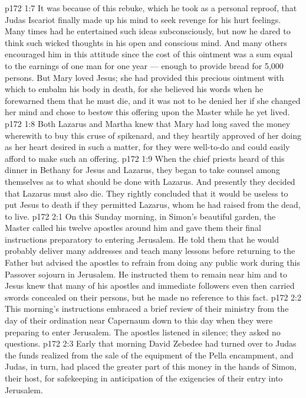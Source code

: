 \vs p172 1:7 It was because of this rebuke, which he took as a personal reproof, that Judas Iscariot finally made up his mind to seek revenge for his hurt feelings. Many times had he entertained such ideas subconsciously, but now he dared to think such wicked thoughts in his open and conscious mind. And many others encouraged him in this attitude since the cost of this ointment was a sum equal to the earnings of one man for one year --- enough to provide bread for 5,000 persons. But Mary loved Jesus; she had provided this precious ointment with which to embalm his body in death, for she believed his words when he forewarned them that he must die, and it was not to be denied her if she changed her mind and chose to bestow this offering upon the Master while he yet lived.
\vs p172 1:8 Both Lazarus and Martha knew that Mary had long saved the money wherewith to buy this cruse of spikenard, and they heartily approved of her doing as her heart desired in such a matter, for they were well\hyp{}to\hyp{}do and could easily afford to make such an offering.
\vs p172 1:9 When the chief priests heard of this dinner in Bethany for Jesus and Lazarus, they began to take counsel among themselves as to what should be done with Lazarus. And presently they decided that Lazarus must also die. They rightly concluded that it would be useless to put Jesus to death if they permitted Lazarus, whom he had raised from the dead, to live.
\vs p172 2:1 On this Sunday morning, in Simon’s beautiful garden, the Master called his twelve apostles around him and gave them their final instructions preparatory to entering Jerusalem. He told them that he would probably deliver many addresses and teach many lessons before returning to the Father but advised the apostles to refrain from doing any public work during this Passover sojourn in Jerusalem. He instructed them to remain near him and to  Jesus knew that many of his apostles and immediate followers even then carried swords concealed on their persons, but he made no reference to this fact.
\vs p172 2:2 This morning’s instructions embraced a brief review of their ministry from the day of their ordination near Capernaum down to this day when they were preparing to enter Jerusalem. The apostles listened in silence; they asked no questions.
\vs p172 2:3 Early that morning David Zebedee had turned over to Judas the funds realized from the sale of the equipment of the Pella encampment, and Judas, in turn, had placed the greater part of this money in the hands of Simon, their host, for safekeeping in anticipation of the exigencies of their entry into Jerusalem.
